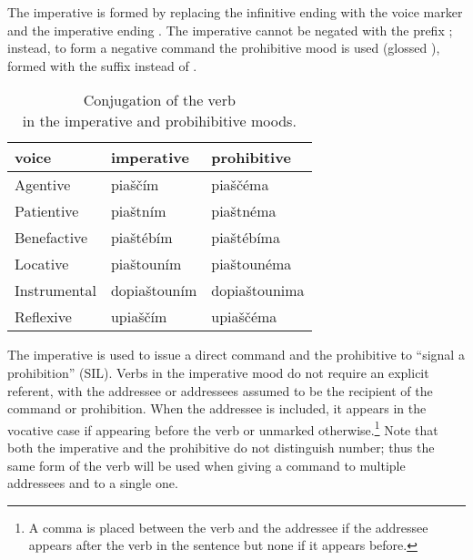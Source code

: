 The imperative is formed by replacing the infinitive ending  with the
voice marker and the imperative ending . The
imperative cannot be negated with the prefix ;
instead, to form a negative command the prohibitive mood
is used (glossed ), formed with the suffix  instead of
.

\begin{table}[ht!]
\sffamily\footnotesize
	\caption{Conjugation of the verb \\ in the imperative and probihibitive moods.}
	\label{tbl:imperative}
\medskip
    \begin{tabu}to 0.7
         \toprule

         {\sc voice}&{\sc imperative}&{\sc prohibitive}  \\
         \midrule

         Agentive &
         {piaščím} &
         {piaščéma}\\

         Patientive &
         {piaštním} &
         {piaštnéma}\\

         Benefactive &
         {piaštébím} &
         {piaštébíma}\\

         Locative &
         {piaštouním} &
         {piaštounéma}\\

         Instrumental &
         {dopiaštouním} &
         {dopiaštounima}\\

         Reflexive &
         {upiaščím} &
         {upiaščéma}\\

         \bottomrule
    \end{tabu}

\end{table}

The imperative is used to issue a direct command and the
prohibitive to ``signal a prohibition'' (SIL). Verbs in
the imperative mood do not require an explicit referent, with the addressee or
addressees assumed to be the recipient of the command or prohibition. When the
addressee is included, it appears in the vocative case if appearing before the
verb or unmarked otherwise.\footnote{A comma is placed between the verb and the
addressee if the addressee appears after the verb in the sentence but none if it
appears before.} Note that both the imperative and the prohibitive do not
distinguish number; thus the same form of the verb will be used when giving a
command to multiple addressees and to a single one.

